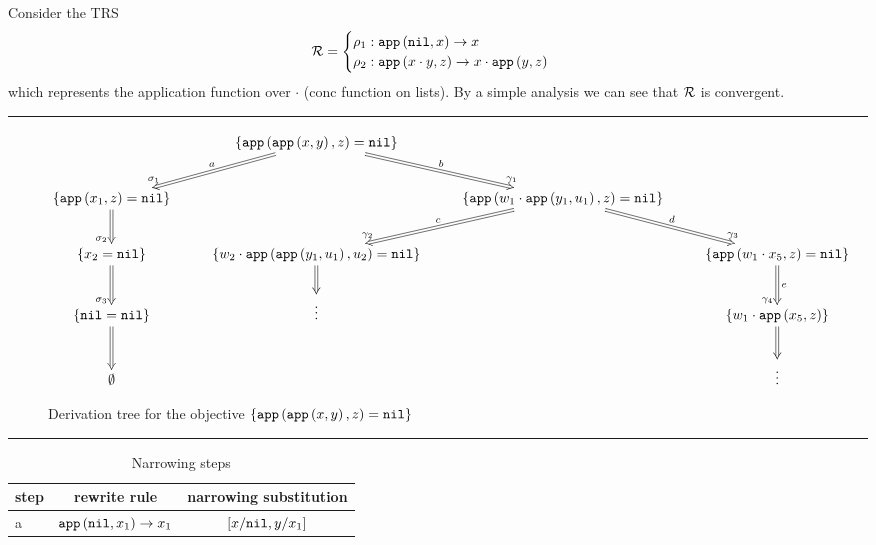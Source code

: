 \begin{example}\label{example:app-concat-standard-narrowing}
	Consider the TRS
	\[
		\mathcal{R} =
		\begin{cases}
			\rho_1: \mathtt{app}\left(\mathtt{nil},x\right) \rightarrow x \\
			\rho_2: \mathtt{app}\left(x \cdot y,z\right) \rightarrow x \cdot \mathtt{app}\left(y,z\right)
		\end{cases}
    \]
    which represents the application function over $\cdot$ (conc function on lists). By a simple analysis we can see that $\mathcal{R}$ is convergent.

    \begin{landscape}
        \thispagestyle{empty}
        \hrule
        \begin{figure}[h!]
            \begin{displaymath}
                \xymatrix{
                     & \{ \appFunc{\appFunc{x}{y}}{z} = \nilList \} \ar@{=>}[dl]_>>{\sigma_1}_a \ar@{=>}[dr]^>>{\gamma_1}^b & & \\
                    \{ \appFunc{x_1}{z} = \nilList \} \ar@{=>}[d]_>>{\sigma_2}  & & \{ \appFunc{w_1 \cdot \appFunc{y_1}{u_1}}{z} = \nilList \} \ar@{=>}[dl]_>>{\gamma_2}_c \ar@{=>}[dr]^>>{\gamma_3}^d & \\
                    \{ x_2 = \nilList \} \ar@{=>}[d]_>>{\sigma_3} & \{ w_2 \cdot \appFunc{\appFunc{y_1}{u_1}}{u_2} = \nilList \} \ar@{=>}[d] & & \{ \appFunc{w_1 \cdot x_5}{z} = \nilList \} \ar@{=>}[d]_>>{\gamma_4}^e \\
                    \{ \nilList = \nilList \} \ar@{=>}[d] & \vdots & & \{ w_1 \cdot \appFunc{x_5}{z} \} \ar@{=>}[d] \\
                    \emptyset & & &  \vdots \\
                }
            \end{displaymath}
            \caption{Derivation tree for the objective $\{ \mathtt{app}\left(\mathtt{app}\left(x,y\right),z\right) = \mathtt{nil} \}$}
            \label{figure:example:app:derivation-tree}
        \end{figure}
        \hrule
        \begin{table}[h!]
            \caption{Narrowing steps}
            \label{table:nice_table}
            \centering
            \begin{tabular}{l  c  c}
            \cline{1-3}
                step & rewrite rule & narrowing substitution \\
            \hline
            a & $\mathtt{app}\left(\mathtt{nil},x_1\right) \rightarrow x_1$ & $[x / \mathtt{nil}, y / x_1]$ \\


\end{tabular}
\end{table}
\end{landscape}
\end{example}
